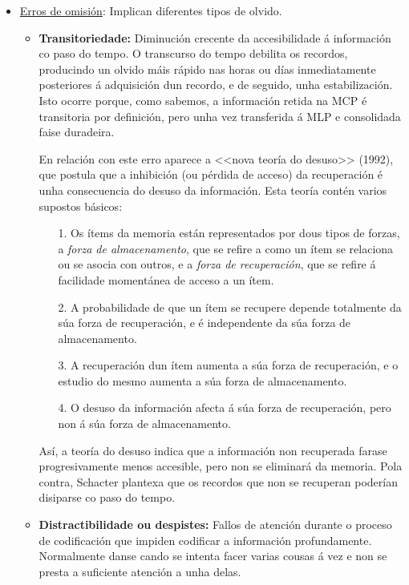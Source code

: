 \documentclass[a4paper,11pt]{article}
\begin{document}
\begin{itemize}
	\item \underline{Erros de omisión}: Implican diferentes tipos de olvido.
	\begin{itemize}
		\item \textbf{Transitoriedade:} Diminución crecente da accesibilidade á información co 
		paso do tempo. O transcurso do tempo debilita os recordos, producindo un olvido máis rápido
		nas horas ou días inmediatamente posteriores á adquisición dun recordo, e de seguido, unha
		estabilización. Isto ocorre porque, como sabemos, a información retida na MCP é transitoria
		por definición, pero unha vez transferida á MLP e consolidada faise duradeira.
		
		En relación con este erro aparece a <<nova teoría do desuso>> (1992), que postula que a
		inhibición (ou pérdida de acceso) da recuperación é unha consecuencia do desuso da
		información. Esta teoría contén varios supostos básicos:
		\begin{enumerate}
			\item[1.] Os ítems da memoria están representados por dous tipos de forzas, a \textit{
			forza de almacenamento}, que se refire a como un ítem se relaciona ou se asocia con 
			outros, e a \textit{forza de recuperación}, que se refire á facilidade momentánea de
			acceso a un ítem.
			\item[2.] A probabilidade de que un ítem se recupere depende totalmente da súa forza de
			recuperación, e é independente da súa forza de almacenamento.
			\item[3.] A recuperación dun ítem aumenta a súa forza de recuperación, e o estudio do
			mesmo aumenta a súa forza de almacenamento.
			\item[4.] O desuso da información afecta á súa forza de recuperación, pero non á súa
			forza de almacenamento.
		\end{enumerate}
		
		Así, a teoría do desuso indica que a información non recuperada farase progresivamente menos
		accesible, pero non se eliminará da memoria. Pola contra, Schacter plantexa que os recordos
		que non se recuperan poderían disiparse co paso do tempo.
		\item \textbf{Distractibilidade ou despistes:} Fallos de atención durante o proceso de 
		codificación que impiden codificar a información profundamente. Normalmente danse cando se
		intenta facer varias cousas á vez e non se presta a suficiente atención a unha delas. 
		

\end{itemize}
\end{itemize}
\end{document}
